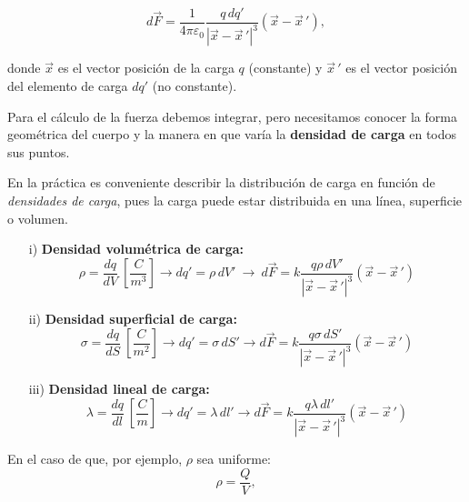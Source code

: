 \begin{shaded}
   \begin{equation*}
d\vec{F} = \frac{1}{4\pi \varepsilon_0} \frac{q \,dq'}{|\vec{x} - \vec{x}\,'|^3} (\vec{x}- \vec{x}\,'),
\end{equation*} 
\end{shaded}

donde $\vec{x}$ es el vector posición de la carga $q$ (constante) y $\vec{x}\,'$ es el vector posición del elemento de carga $dq'$ (no constante).

Para el cálculo de la fuerza debemos integrar, pero necesitamos conocer la forma geométrica del cuerpo y la manera en que varía la \textbf{densidad de carga} en todos sus puntos.

En la práctica es conveniente describir la distribución de carga en función de \textit{densidades de carga}, pues la carga puede estar distribuida en una línea, superficie o volumen.

\begin{itemize}
\item[i)] \textbf{Densidad volumétrica de carga:}
\begin{equation*}
\rho = \frac{dq}{dV} ~ \left[\frac{C}{m^3} \right] \rightarrow dq' = \rho \, dV' ~\rightarrow~ d \vec{F} = k \frac{q \rho \,dV'}{|\vec{x} - \vec{x}\,'|^3} (\vec{x} - \vec{x}\,')
\end{equation*}

\item[ii)] \textbf{Densidad superficial de carga:}
\begin{equation*}
\sigma = \frac{dq}{dS} ~ \left[\frac{C}{m^2} \right] \rightarrow dq' = \sigma \, dS' \rightarrow d \vec{F} = k \frac{q \sigma \, dS'}{|\vec{x} - \vec{x}\,'|^3} (\vec{x} - \vec{x}\,')
\end{equation*}


\item[iii)] \textbf{Densidad lineal de carga:} 
\begin{equation*}
\lambda = \frac{dq}{dl} ~ \left[\frac{C}{m} \right] \rightarrow dq' = \lambda \, dl' \rightarrow d \vec{F} = k \frac{q \lambda \,dl'}{|\vec{x} - \vec{x}\,'|^3} (\vec{x} - \vec{x}\,')
\end{equation*}

\end{itemize}

En el caso de que, por ejemplo, $\rho$ sea uniforme:
\begin{equation*}
\rho = \frac{Q}{V},
\end{equation*}

